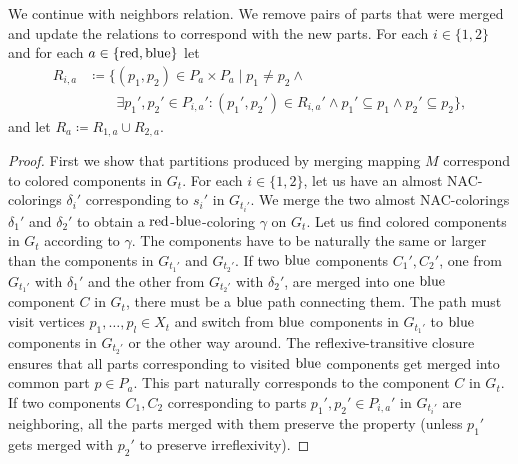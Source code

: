 We continue with neighbors relation. We remove pairs of parts
that were merged and update the relations to correspond with the new parts.
For each \( i \in \{1, 2\} \) and for each \( a \in \{\text{red}, \text{blue}\} \) let
%
\begin{align*}
	R_{i,a} & \coloneqq \{(p_1, p_2) \in P_a \times P_a \mid p_{1} \ne p_{2} \land                                                    \\
	        & \qquad \exists p_1', p_2' \in P_{i,a}' : (p_1', p_2') \in R_{i,a}' \land p_1' \subseteq p_1 \land p_2' \subseteq p_2\},
\end{align*}
%
and let \( R_a \coloneqq R_{1,a} \cup R_{2,a} \).

%
\begin{proof}
	First we show that partitions produced by merging mapping \( M \)
	correspond to colored components in \( G_t \).
	For each \( i \in \{1, 2\} \),
	let us have an almost NAC-colorings \( \delta_i' \) corresponding
	to \( s_i' \) in \( G_{t_i'} \).
	We merge the two almost NAC-colorings \( \delta_1' \) and \( \delta_2' \)
	to obtain a \( \text{red} \)-\( \text{blue} \)-coloring \( \gamma \) on \( G_t \).
	Let us find colored components in \( G_t \) according to \(	\gamma \).
	The components have to be naturally the same or larger
	than the components in \( G_{t_1'} \) and \( G_{t_2'} \).
	If two \( \text{blue} \) components \( C_1', C_2' \),
	one from \( G_{t_1'} \) with \( \delta_1' \) and
	the other from \( G_{t_2'} \) with \( \delta_2' \),
	are merged into one \( \text{blue} \) component \( C \) in \( G_t \),
	there must be a \( \text{blue} \) path connecting them.
	The path must visit vertices \( p_1, \dots, p_l \in X_t \)
	and switch from \( \text{blue} \) components in \( G_{t_1'} \)
	to \( \text{blue} \) components in \( G_{t_2'} \) or the other way around.
	The reflexive-transitive closure ensures that
	all parts corresponding to visited \( \text{blue} \) components
	get merged into common part \( p \in P_a \).
	This part naturally corresponds to the component \( C \) in \( G_t \).
	If two components \( C_1, C_2 \) corresponding to
	parts \( p_1', p_2' \in P_{i,a}' \) in \( G_{t_i'} \) are neighboring,
	all the parts merged with them preserve the property
	(unless \( p_1' \) gets merged with \( p_2' \) to preserve irreflexivity).
\end{proof}

